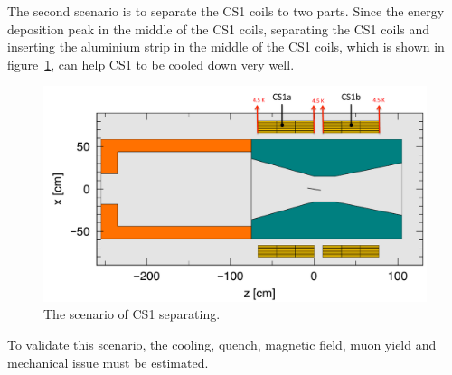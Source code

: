 The second scenario is to separate the CS1 coils to two parts.
Since the energy deposition peak in the middle of the CS1 coils, separating the CS1 coils and inserting the aluminium strip in the middle of the CS1 coils, which is shown in figure~\ref{5new}, can help CS1 to be cooled down very well.
\begin{figure}[H]
 \centering
 \includegraphics[scale=0.4]{chapter6/fig/CS1new.pdf}
 \caption{ The scenario of CS1 separating.}
 \label{5new}
\end{figure}
To validate this scenario, the cooling, quench, magnetic field, muon yield and mechanical issue must be estimated.


